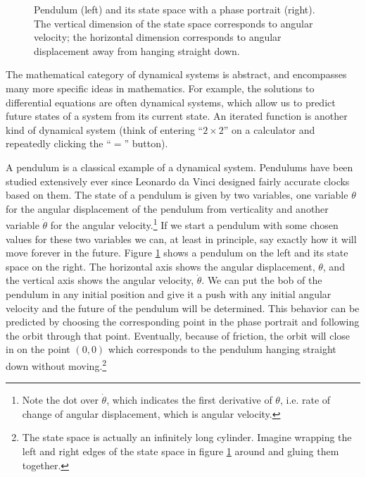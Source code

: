 \begin{figure}[h]
\centering
{}
\hspace*{.8in}
\caption[Left: From ; Right: Scott Hotton.]{Pendulum (left) and its state space with a phase portrait (right). The vertical dimension of the state space corresponds to angular velocity; the horizontal dimension corresponds to angular displacement away from hanging straight down.}
\label{F:pendulumStateSpace}
\end{figure}

The mathematical category of dynamical systems is abstract, and encompasses many more specific ideas in mathematics. For example, the solutions to differential equations are often dynamical systems, which allow us to predict future states of a system from its current state. An iterated function is another kind of dynamical system (think of entering ``$2 \times 2$'' on a calculator and repeatedly clicking the ``$=$'' button).

A pendulum is a classical example of a dynamical system. Pendulums have been studied extensively ever since Leonardo da Vinci designed fairly accurate clocks based on them. The state of a pendulum is given by two variables, one variable $\theta$ for the angular displacement of the pendulum from verticality and another variable $\dot{\theta}$ for the angular velocity.\footnote{Note the dot over $\dot{\theta}$, which indicates the first derivative of $\theta$, i.e. rate of change of angular displacement, which is angular velocity.} If we start a pendulum with some chosen values for these two variables we can, at least in principle, say exactly how it will move forever in the future. Figure \ref{F:pendulumStateSpace} shows a pendulum on the left and its state space on the right. The horizontal axis shows the angular displacement, $\theta$, and the vertical axis shows the angular velocity, $\dot{\theta}$. We can put the bob of the pendulum in any initial position and give it a push with any initial angular velocity and the future of the pendulum will be determined. This behavior can be predicted by choosing the corresponding point in the phase portrait and following the orbit through that point. Eventually, because of friction, the orbit will close in on the point $(0,0)$ which corresponds to the pendulum hanging straight down without moving.\footnote{The state space is actually an infinitely long cylinder. Imagine wrapping the left and right edges of the state space in figure \ref{F:pendulumStateSpace} around and gluing them together.}

